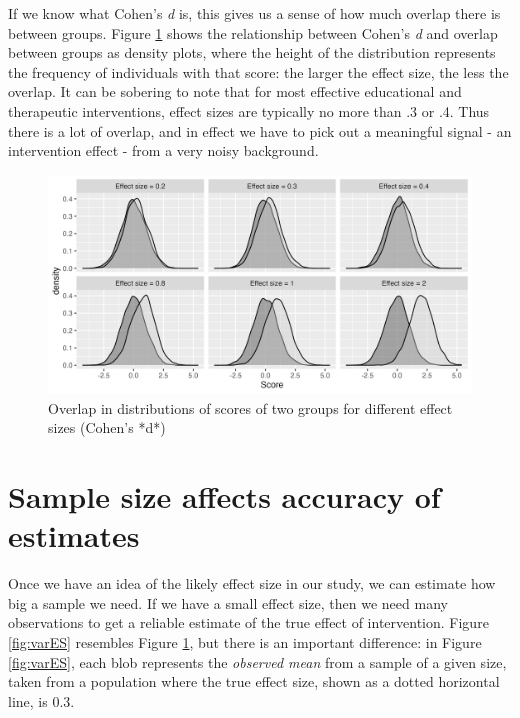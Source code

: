 \documentclass{krantz}
\begin{document}
If we know what Cohen's \emph{d} is, this gives us a sense of how much overlap there is between groups. Figure \ref{fig:effsizefig} shows the relationship between Cohen's \emph{d} and overlap between groups as density plots, where the height of the distribution represents the frequency of individuals with that score: the larger the effect size, the less the overlap. It can be sobering to note that for most effective educational and therapeutic interventions, effect sizes are typically no more than .3 or .4. Thus there is a lot of overlap, and in effect we have to pick out a meaningful signal - an intervention effect - from a very noisy background.

\begin{figure}
\includegraphics[width=1\linewidth]{images_bw/densityplot} \caption{Overlap in distributions of scores of two groups for different effect sizes (Cohen's *d*)}\label{fig:effsizefig}
\end{figure}

\hypertarget{sample-size-affects-accuracy-of-estimates}{%
\section{Sample size affects accuracy of estimates}\label{sample-size-affects-accuracy-of-estimates}}

Once we have an idea of the likely effect size in our study, we can estimate how big a sample we need. If we have a small effect size, then we need many observations to get a reliable estimate of the true effect of intervention. Figure \ref{fig:varES} resembles Figure \ref{fig:effsizefig}, but there is an important difference: in Figure \ref{fig:varES}, each blob represents the \emph{observed mean} from a sample of a given size, taken from a population where the true effect size, shown as a dotted horizontal line, is 0.3.
\end{document}
